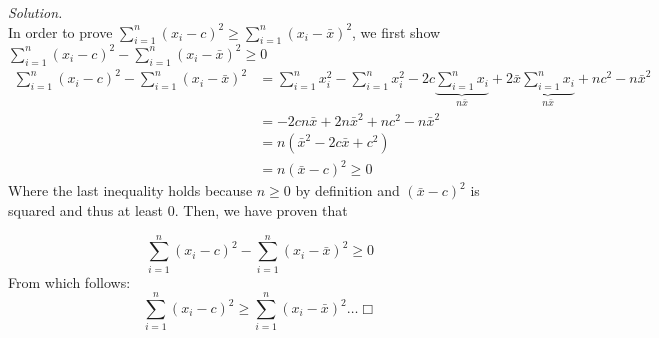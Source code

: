 \documentclass[
]{article}
\begin{document}
\textit{Solution.}\\
In order to prove
\(\sum_{i=1}^n(x_i-c)^2 \ge \sum_{i=1}^n(x_i-\bar{x})^2\), we first show
\(\sum_{i=1}^n(x_i-c)^2 - \sum_{i=1}^n(x_i-\bar{x})^2 \ge 0\)
\[\begin{aligned}
\sum_{i=1}^n(x_i-c)^2 - \sum_{i=1}^n(x_i-\bar{x})^2 &= \sum_{i=1}^nx_i^2 - \sum_{i=1}^nx_i^2 - 2c\underbrace{\sum_{i=1}^nx_i}_{n\bar{x}} + 2\bar{x} \underbrace{\sum_{i=1}^nx_i}_{n\bar{x}} + nc^2 -n\bar{x}^2\\
&= -2cn\bar{x} + 2n\bar{x}^2 + nc^2 - n \bar{x}^2 \\
&= n(\bar{x}^2 -2c\bar{x}+ c^2) \\
&= n(\bar{x} - c)^2 \ge 0
\end{aligned}\] Where the last inequality holds because \(n \ge 0\) by
definition and \((\bar{x} - c)^2\) is squared and thus at least \(0\).
Then, we have proven that

\[\sum_{i=1}^n(x_i-c)^2 - \sum_{i=1}^n(x_i-\bar{x})^2 \ge 0\] From which
follows:
\[\sum_{i=1}^n(x_i-c)^2 \ge \sum_{i=1}^n(x_i-\bar{x})^2 \dots \Box\]
\end{document}
